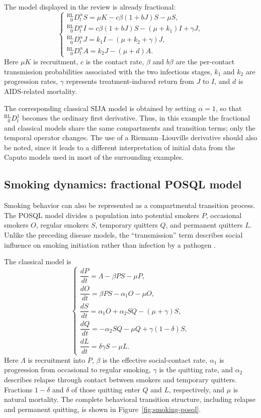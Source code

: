\documentclass[00-main.tex]{subfiles}
\begin{document}
The model displayed in the review is already fractional:
\[
\begin{cases}
 {}_{\phantom{R}0}^{\mathrm{RL}}\!D_t^\alpha S=\mu K-c\beta(1+bJ)S-\mu S,\\[3pt]
 {}_{\phantom{R}0}^{\mathrm{RL}}\!D_t^\alpha I=c\beta(1+bJ)S-(\mu+k_1)I+\gamma J,\\[3pt]
 {}_{\phantom{R}0}^{\mathrm{RL}}\!D_t^\alpha J=k_1I-(\mu+k_2+\gamma)J,\\[3pt]
 {}_{\phantom{R}0}^{\mathrm{RL}}\!D_t^\alpha A=k_2J-(\mu+d)A.
\end{cases}
\]
Here $\mu K$ is recruitment, $c$ is the contact rate, $\beta$ and $b\beta$ are the per-contact transmission probabilities associated with the two infectious stages, $k_1$ and $k_2$ are progression rates, $\gamma$ represents treatment-induced return from $J$ to $I$, and $d$ is AIDS-related mortality.

The corresponding classical SIJA model is obtained by setting $\alpha=1$, so that ${}_{\phantom{R}0}^{\mathrm{RL}}D_t^1$ becomes the ordinary first derivative.
Thus, in this example the fractional and classical models share the same compartments and transition terms; only the temporal operator changes. The use of a Riemann--Liouville derivative should also be noted, since it leads to a different interpretation of initial data from the Caputo models used in most of the surrounding examples.


\subsection{Smoking dynamics: fractional POSQL model}

Smoking behavior can also be represented as a compartmental transition process.
The POSQL model divides a population into potential smokers $P$, occasional smokers $O$, regular smokers $S$, temporary quitters $Q$, and permanent quitters $L$.
Unlike the preceding disease models, the ``transmission'' term describes social influence on smoking initiation rather than infection by a pathogen \cite{Ch21,Abdullah18}.

The classical model is
\[
\begin{cases}
 \dfrac{dP}{dt}=\Lambda-\beta PS-\mu P,\\[8pt]
 \dfrac{dO}{dt}=\beta PS-\alpha_1O-\mu O,\\[8pt]
 \dfrac{dS}{dt}=\alpha_1O+\alpha_2SQ-(\mu+\gamma)S,\\[8pt]
 \dfrac{dQ}{dt}=-\alpha_2SQ-\mu Q+\gamma(1-\delta)S,\\[8pt]
 \dfrac{dL}{dt}=\delta\gamma S-\mu L.
\end{cases}
\]
Here $\Lambda$ is recruitment into $P$, $\beta$ is the effective social-contact rate, $\alpha_1$ is progression from occasional to regular smoking, $\gamma$ is the quitting rate, and $\alpha_2$ describes relapse through contact between smokers and temporary quitters.
Fractions $1-\delta$ and $\delta$ of those quitting enter $Q$ and $L$, respectively, and $\mu$ is natural mortality.
The complete behavioral transition structure, including relapse and permanent quitting, is shown in Figure~\ref{fig:smoking-posql}.
\end{document}
